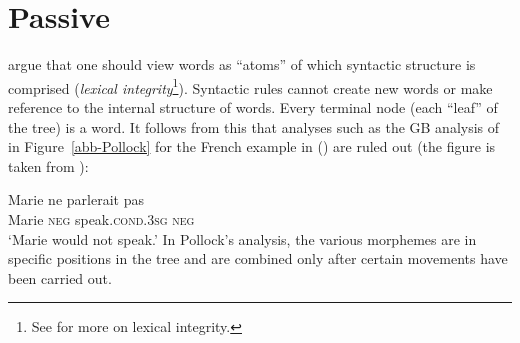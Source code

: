 \section{Passive}
\label{Abschnitt-LFG-Passiv}


\mbox{}\citet{BM95a} argue that one should view words as ``atoms'' of
which syntactic structure is comprised (\emph{lexical integrity}\footnote{%
 See  for more on lexical integrity.%
}).
Syntactic rules cannot create new words or make reference to the internal structure of words. Every terminal node (each ``leaf'' of the tree) is a word. It follows from this that
analyses such as the GB analysis of \citet{Pollock89a-u} in Figure~\vref{abb-Pollock} for the French example in ()  are ruled out (the figure is taken from
\citealp[]{Kuhn2007a}): 

\ea
\gll Marie ne parlerait pas \\
     Marie \textsc{neg} speak.\textsc{cond.3sg} \textsc{neg}\\
\glt `Marie would not speak.'
\z
%
In Pollock's analysis, the various morphemes are in specific positions in the tree and are combined only after certain movements have been carried out.

